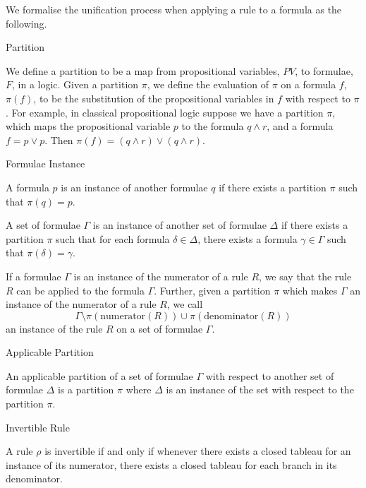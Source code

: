 \documentclass{llncs}
\begin{document}
We formalise the unification process when applying a rule to a formula as the
following.
\begin{definition}{Partition}\label{Partition}

We define a partition to be a map from propositional variables, $PV$, to
formulae, $F$, in a logic. Given a partition $\pi$, we define the evaluation of
$\pi$ on a formula $f$, $\pi(f)$, to be the substitution of the propositional
variables in $f$ with respect to $\pi$. For example, in classical propositional
logic suppose we have a partition $\pi$, which maps the propositional variable
$p$ to the formula $q \wedge r$, and a formula $f = p \vee p$. Then $\pi(f) =
(q \wedge r) \vee (q \wedge r)$.
\end{definition}
\begin{definition}{Formulae Instance}\label{Formulae Instance}

A formula $p$ is an instance of another formulae $q$ if there exists a
partition $\pi$ such that $\pi(q) = p$.

A set of formulae $\Gamma$ is an instance of another set of formulae
$\Delta$ if there exists a partition $\pi$ such that for each formula $\delta
\in \Delta$, there exists a formula $\gamma \in \Gamma$ such that $\pi(\delta)
= \gamma$.

If a formulae $\Gamma$ is an instance of the numerator of a rule $R$, we say
that the rule $R$ can be applied to the formula $\Gamma$. Further, given a
partition $\pi$ which makes $\Gamma$ an instance of the numerator of a rule
$R$, we call
%
$$\Gamma \setminus \pi(\textrm{numerator}(R)) \cup
\pi(\textrm{denominator}(R))$$
%
an instance of the rule $R$ on a set of formulae $\Gamma$.
\end{definition}
\begin{definition}{Applicable Partition}\label{Applicable Partition}

An applicable partition of a set of formulae $\Gamma$ with respect to another
set of formulae $\Delta$ is a partition $\pi$ where $\Delta$ is an instance of
the set with respect to the partition $\pi$.
\end{definition}
\begin{definition}{Invertible Rule}\label{Invertible Rule}

A rule $\rho$ is invertible if and only if whenever there exists a closed
tableau for an instance of its numerator, there exists a closed tableau for
each branch in its denominator.
\end{definition}
%
\end{document}
